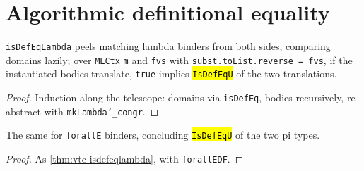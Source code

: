 \section{Algorithmic definitional equality}

\begin{lemma}
  \label{thm:vtc-isdefeqlambda}
  \leanok

   \texttt{isDefEqLambda} peels matching lambda binders from both sides,
  comparing domains lazily; over \texttt{MLCtx} \texttt{m} and \texttt{fvs} with
  \texttt{subst.toList.reverse = fvs}, if the instantiated bodies translate, \texttt{true}
  implies \hl{\texttt{IsDefEqU}} of the two translations.
\end{lemma}
\begin{proof}
  \leanok
   Induction along the telescope: domains via \texttt{isDefEq}, bodies recursively,
  re-abstract with \texttt{mkLambda'\_congr}.
\end{proof}

\begin{lemma}
  \label{thm:vtc-isdefeqforall}
  \leanok

   The same for \texttt{forallE} binders, concluding \hl{\texttt{IsDefEqU}} of
  the two pi types.
\end{lemma}
\begin{proof}
  \leanok
   As \ref{thm:vtc-isdefeqlambda}, with \texttt{forallEDF}.
\end{proof}

